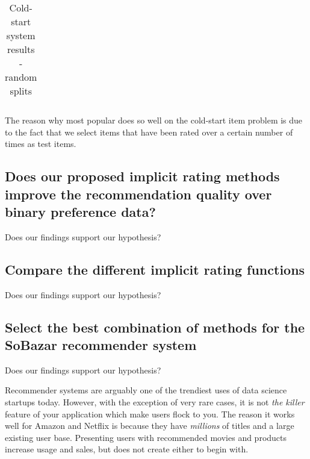 \begin{table}[H]
{\begin{tabular}{*{17}{l}}
\bottomrule
\end{tabular}
}
\caption{Cold-start system results - random splits}
\end{table}















The reason why most popular does so well on the cold-start item problem is due to the fact that we select items that have been rated over a certain number of times as test items.

















\subsection{Does our proposed implicit rating methods improve the recommendation quality over binary preference data?}

Does our findings support our hypothesis?



\subsection{Compare the different implicit rating functions}

Does our findings support our hypothesis?

\subsection{Select the best combination of methods for the SoBazar recommender system}

Does our findings support our hypothesis?












Recommender systems are arguably one of the trendiest uses of data science startups today. However, with the exception of very
rare cases, it is not \emph{the killer} feature of your application which make users flock to you. The reason it works
well for Amazon and Netflix is because they have \emph{millions} of titles and a large existing user base. Presenting users
with recommended movies and products increase usage and sales, but does not create either to begin with.

